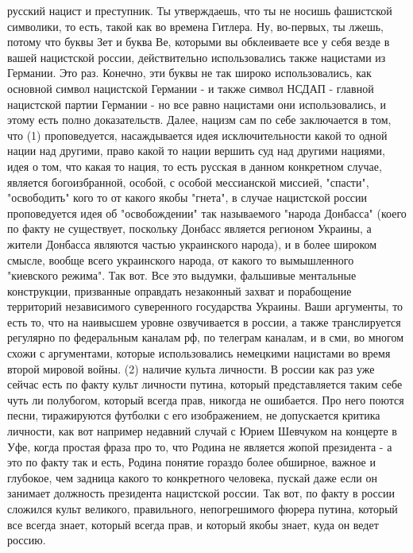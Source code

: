 русский нацист и преступник. Ты утверждаешь, что ты не носишь фашистской
символики, то есть, такой как во времена Гитлера. Ну, во-первых, ты лжешь,
потому что буквы Зет и буква Ве, которыми вы обклеиваете все у себя везде в
вашей нацистской россии, действительно использовались также нацистами из
Германии. Это раз. Конечно, эти буквы не так широко использовались, как
основной символ нацистской Германии - и также символ НСДАП - главной нацистской
партии Германии - но все равно нацистами они использовались, и этому есть полно
доказательств. Далее, нацизм сам по себе заключается в том, что (1)
проповедуется, насаждывается идея исключительности какой то одной нации над
другими, право какой то нации вершить суд над другими нациями, идея о том, что
какая то нация, то есть русская в данном конкретном случае, является
богоизбранной, особой, с особой мессианской миссией, "спасти", "освободить"
кого то от какого якобы "гнета", в случае нацистской россии проповедуется идея
об "освобождении" так называемого "народа Донбасса" (коего по факту не
существует, поскольку Донбасс является регионом Украины, а жители Донбасса
являются частью украинского народа), и в более широком смысле, вообще всего
украинского народа, от какого то вымышленного "киевского режима". Так вот.  Все
это выдумки, фальшивые ментальные конструкции, призванные оправдать незаконный
захват и порабощение территорий независимого суверенного государства Украины.
Ваши аргументы, то есть то, что на наивысшем уровне озвучивается в россии, а
также транслируется регулярно по федеральным каналам рф, по телеграм каналам, и
в сми, во многом схожи с аргументами, которые использовались немецкими
нацистами во время второй мировой войны.  (2) наличие культа личности. В россии
как раз уже сейчас есть по факту культ личности путина, который представляется
таким себе чуть ли полубогом, который всегда прав, никогда не ошибается. Про
него поются песни, тиражируются футболки с его изображением, не допускается
критика личности, как вот например недавний случай с Юрием Шевчуком на концерте
в Уфе, когда простая фраза про то, что Родина не является жопой президента - а
это по факту так и есть, Родина понятие гораздо более обширное, важное и
глубокое, чем задница какого то конкретного человека, пускай даже если он
занимает должность президента нацистской россии. Так вот, по факту в россии
сложился культ великого, правильного, непогрешимого фюрера путина, который все
всегда знает, который всегда прав, и который якобы знает, куда он ведет россию.


